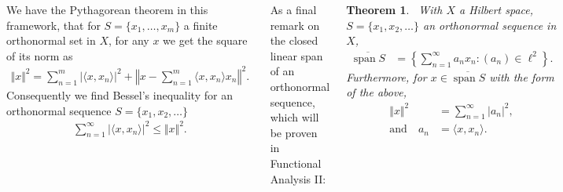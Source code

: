 \documentclass{tikzposter} %
\DeclareMathOperator{\Span}{span}
\newtheorem{theorem}{Theorem}
\newtheorem{definition}{Definition}
\begin{document}
\begin{columns}
{    We have the Pythagorean theorem in this framework, that for $S = \{x_{1},\dots,x_{m}\}$ a finite orthonormal set in $X$, for any $x$ we get the square of its norm as
    \begin{align*}
      \Vert x \Vert^{2} = \sum_{n=1}^{m} |\langle x, x_{n} \rangle|^{2} + \left\Vert x - \sum_{n=1}^{m} \langle x , x_{n} \rangle x_{n} \right\Vert^{2}.
    \end{align*}
    Consequently we find Bessel's inequality for an orthonormal sequence $S = \{x_{1}, x_{2}, \dots\}$
    \begin{align*}
      \sum_{n=1}^{\infty} |\langle x, x_{n} \rangle|^{2} \le \Vert x \Vert ^{2}.
    \end{align*}

    As a final remark on the closed linear span of an orthonormal sequence, which will be proven in Functional Analysis II: \\

    \begin{theorem}
    \ With $X$ a Hilbert space, $S = \{x_{1},x_{2},\dots\}$ an orthonormal sequence in $X$,
    \begin{align*}
      \overline{\Span S} &= \left\{\sum_{n=1}^{\infty} a_{n} x_{n} : (a_{n}) \in \ell^{2} \right\}.
    \end{align*}
    Furthermore, for $x \in \overline{\Span S}$ with the form of the above,
    \begin{align*}
      \Vert x \Vert^{2} &= \sum_{n=1}^{\infty} |a_{n}|^{2}, \\
      \text{and} \quad a_{n} &= \langle x , x_{n} \rangle.
    \end{align*}

    \end{theorem}


  }
\end{columns}
\end{document}
